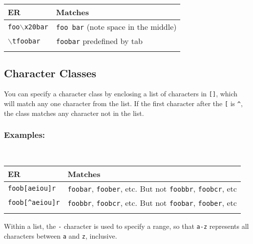 \begin{footnotesize}
  \begin{tabularx}{\textwidth}{>{\hsize=0.3\hsize}X>{\hsize=0.7\hsize}X}\\
    \hline
    \textbf{ER} & \textbf{Matches} \\
    \hline
    \texttt{foo$\backslash$x20bar} & \texttt{foo bar} (note space in the middle) \\
    \texttt{$\backslash$tfoobar} & \texttt{foobar} predefined by tab \\
    \hline
    \\
  \end{tabularx}
\end{footnotesize}


\subsection{Character Classes}

You can specify a character class by enclosing a list of characters in
\texttt{[]}, which will match any one character from the list. If the
first character after the \texttt{[} is \texttt{\^{}}, the class matches
any character not in the list.


\subsubsection{Examples:}\\

\begin{footnotesize}
  \begin{tabularx}{\textwidth}{>{\hsize=0.3\hsize}X>{\hsize=0.7\hsize}X}\\
    \hline
    \textbf{ER} & \textbf{Matches} \\
    \hline
    \texttt{foob[aeiou]r} & \texttt{foobar}, \texttt{foober}, etc. But not \texttt{foobbr}, \texttt{foobcr}, etc \\
    \texttt{foob[\^{}aeiou]r} & \texttt{foobbr}, \texttt{foobcr}, etc. But not \texttt{foobar}, \texttt{foober}, etc \\
    \hline
    \\
  \end{tabularx}
\end{footnotesize}

Within a list, the \texttt{-} character is used to specify a range, so
that \texttt{a-z} represents all characters between \texttt{a} and
\texttt{z}, inclusive.

